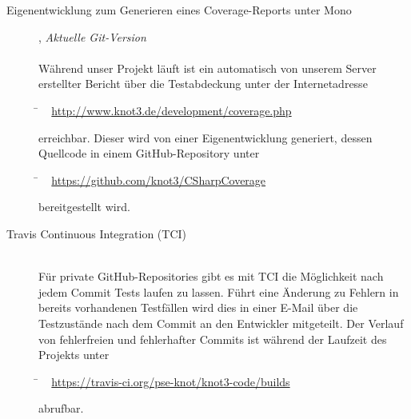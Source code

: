 \begin{description}
	\item[Eigenentwicklung zum Generieren eines Coverage-Reports unter Mono], \textit{Aktuelle Git-Version}\hfill
	\\
	\\
	Während unser Projekt läuft ist ein automatisch von unserem Server erstellter Bericht über die Testabdeckung unter der Internetadresse
	
	\begin{tabbing}
			\= ~ \href {http://www.knot3.de/development/coverage.php}
					   {http://www.knot3.de/development/coverage.php}
					   
	\end{tabbing} erreichbar.
	Dieser wird von einer Eigenentwicklung generiert, dessen Quellcode in einem GitHub-Repository unter
	\begin{tabbing}
			\= ~ \href {https://github.com/knot3/CSharpCoverage}
					   {https://github.com/knot3/CSharpCoverage}
					   
	\end{tabbing} bereitgestellt wird.
	\\
	
	\item[Travis Continuous Integration (TCI)] \hfill
	\\
	
	Für private GitHub-Repositories gibt es mit TCI die Möglichkeit nach jedem Commit Tests laufen zu lassen.
	Führt eine Änderung zu Fehlern in bereits vorhandenen Testfällen wird dies in einer E-Mail über die Testzustände nach dem Commit an den Entwickler mitgeteilt. Der Verlauf von fehlerfreien und fehlerhafter Commits ist während der Laufzeit des Projekts unter
	
	\begin{tabbing}
			\= ~ \href {https://travis-ci.org/pse-knot/knot3-code/builds}
		    {https://travis-ci.org/pse-knot/knot3-code/builds}
		   
	\end{tabbing} abrufbar.
	\\
	

\end{description}


